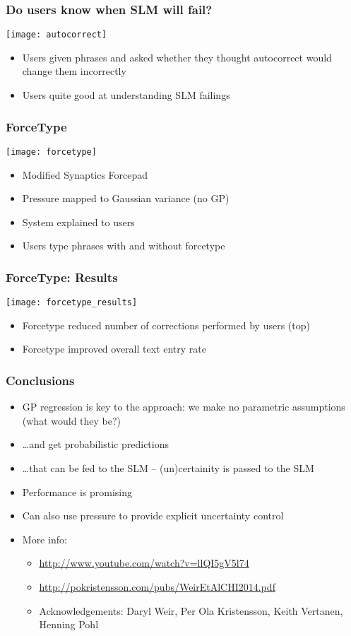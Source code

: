 \begin{frame}
	\frametitle{Do users know when \ac{SLM} will fail?}
	\centering\texttt{[image: autocorrect]}
	\begin{itemize}
		\item Users given phrases and asked whether they thought autocorrect would change them incorrectly
		\item Users quite good at understanding \ac{SLM} failings
	\end{itemize}
\end{frame}

\begin{frame}
	\frametitle{ForceType}
	\centering\texttt{[image: forcetype]}
	\begin{itemize}
		\item Modified Synaptics Forcepad
		\item Pressure mapped to Gaussian variance (no \ac{GP})
		\item System explained to users
		\item Users type phrases with and without forcetype
	\end{itemize}
\end{frame}

\begin{frame}
	\frametitle{ForceType: Results}
	\begin{multicols}{2}
		\texttt{[image: forcetype\_results]}
		\newpage
		\vfill
		\begin{itemize}
			\item Forcetype reduced number of corrections performed by users (top)
			\item Forcetype improved overall text entry rate
		\end{itemize}
		\vfill
	\end{multicols}
\end{frame}

\begin{frame}
	\frametitle{Conclusions}
		\begin{itemize}
			\item GP regression is key to the approach: we make no parametric assumptions (what would they be?)
			\item \ldots and get probabilistic predictions
			\item \ldots that can be fed to the \ac{SLM} -- (un)certainity is passed to the \ac{SLM}
			\item Performance is promising
			\item<2->Can also use pressure to provide explicit uncertainty control
			\item<3->More info:
			\begin{itemize}
				\item \url{http://www.youtube.com/watch?v=llQI5gV5l74}
				\item \url{http://pokristensson.com/pubs/WeirEtAlCHI2014.pdf}
				\item Acknowledgements: Daryl Weir, Per Ola Kristensson, Keith Vertanen, Henning Pohl
			\end{itemize}
		\end{itemize}
\end{frame}

